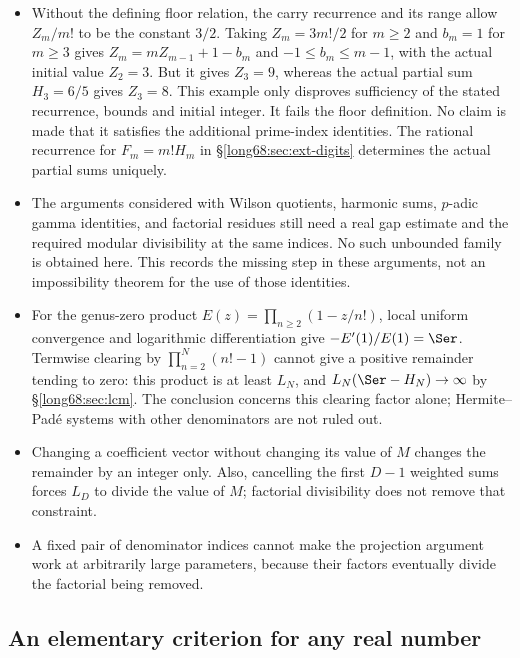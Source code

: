 \begin{itemize}
\item Without the defining floor relation, the carry recurrence and its
  range allow $Z_m/m!$ to be the constant $3/2$. Taking $Z_m=3m!/2$ for
  $m\ge2$ and $b_m=1$ for $m\ge3$ gives
  $Z_m=mZ_{m-1}+1-b_m$ and $-1\le b_m\le m-1$, with the actual initial
  value $Z_2=3$. But it gives $Z_3=9$, whereas the actual partial sum
  $H_3=6/5$ gives $Z_3=8$. This example only disproves sufficiency of
  the stated recurrence, bounds and initial integer. It fails the floor
  definition. No claim is made that it satisfies the additional prime-index
  identities. The rational recurrence for $F_m=m!H_m$ in
  \S\ref{long68:sec:ext-digits} determines the actual partial sums uniquely.
\item The arguments considered with Wilson quotients, harmonic sums,
  $p$-adic gamma identities, and factorial residues still need a real
  gap estimate and the required modular divisibility at the same indices.
  No such unbounded family is obtained here. This records the missing
  step in these arguments, not an impossibility theorem for the use of
  those identities.
\item For the genus-zero product $E(z)=\prod_{n\ge2}(1-z/n!)$, local uniform
  convergence and logarithmic differentiation give $-E'(1)/E(1)=\Ser$.
  Termwise clearing by $\prod_{n=2}^N(n!-1)$ cannot give a positive
  remainder tending to zero: this product is at least $L_N$, and
  $L_N(\Ser-H_N)\to\infty$ by \S\ref{long68:sec:lcm}. The conclusion concerns
  this clearing factor alone; Hermite--Pad\'e systems with other
  denominators are not ruled out.
\item Changing a coefficient vector without changing its value of $M$ changes
  the remainder by an integer only. Also, cancelling the first $D-1$ weighted
  sums forces $L_D$ to divide the value of $M$; factorial divisibility does not
  remove that constraint.
\item A fixed pair of denominator indices cannot make the projection
  argument work at arbitrarily large parameters, because their factors
  eventually divide the factorial being removed.
\end{itemize}

\subsection{An elementary criterion for any real number}
\label{long68:sec:ext-generic}

